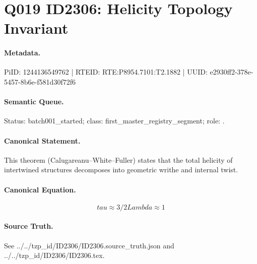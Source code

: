 \section*{Q019 ID2306: Helicity Topology Invariant}
\paragraph{Metadata.}
PiID: 1244136549762 | RTEID: RTE:P8954.7101:T2.1882 | UUID: e2930ff2-378e-5457-8b6e-f581d30f72f6

\paragraph{Semantic Queue.}
Status: batch001\_started; class: first\_master\_registry\_segment; role: .

\paragraph{Canonical Statement.}
This theorem (Calugareanu--White--Fuller) states that the total helicity of intertwined structures decomposes into geometric writhe and internal twist.

\paragraph{Canonical Equation.}
\[
tau \approx 3/2 Lambda \approx 1
\]

\paragraph{Source Truth.}
See ../../tzp\_id/ID2306/ID2306.source\_truth.json and ../../tzp\_id/ID2306/ID2306.tex.
